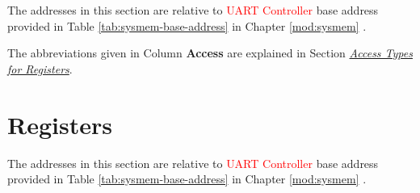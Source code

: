 \documentclass[main\_\_EN.tex]{subfiles}
\begin{document}
The addresses in this section are relative to \textcolor{red}{UART Controller} base address provided in Table \ref{tab:sysmem-base-address} in Chapter \ref{mod:sysmem} \textit{}.

The abbreviations given in Column \textbf{Access} are explained in Section \hyperref[glossary-access-types]{\textit{Access Types for Registers}}.






\clearpage
\section{Registers}

The addresses in this section are relative to \textcolor{red}{UART Controller} base address provided in Table \ref{tab:sysmem-base-address} in Chapter \ref{mod:sysmem} \textit{}.


\end{document}
